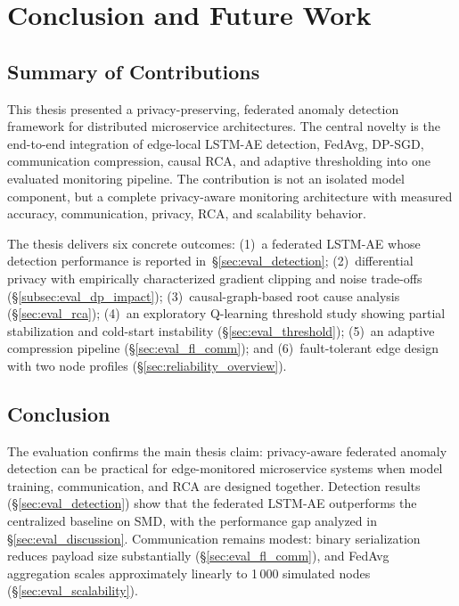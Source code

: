 \chapter{Conclusion and Future Work}
\label{ch:conclusion}

\section{Summary of Contributions}
\label{sec:conclusion_summary}

This thesis presented a privacy-preserving, federated anomaly detection
framework for distributed microservice architectures. The central novelty is
the end-to-end integration of edge-local LSTM-AE detection, FedAvg, DP-SGD,
communication compression, causal RCA, and adaptive thresholding into one
evaluated monitoring pipeline. The contribution is not an isolated model
component, but a complete privacy-aware monitoring architecture with measured
accuracy, communication, privacy, RCA, and scalability behavior.

The thesis delivers six concrete outcomes: (1)~a federated LSTM-AE whose
detection performance is reported in~\S\ref{sec:eval_detection};
(2)~differential privacy with empirically characterized gradient clipping and
noise trade-offs (\S\ref{subsec:eval_dp_impact}); (3)~causal-graph-based root
cause analysis (\S\ref{sec:eval_rca}); (4)~an exploratory Q-learning
threshold study showing partial stabilization and cold-start instability
(\S\ref{sec:eval_threshold}); (5)~an adaptive compression pipeline
(\S\ref{sec:eval_fl_comm}); and (6)~fault-tolerant edge design with two node
profiles (\S\ref{sec:reliability_overview}).

\section{Conclusion}
\label{sec:conclusion_conclusion}

The evaluation confirms the main thesis claim: privacy-aware federated anomaly
detection can be practical for edge-monitored microservice systems when model
training, communication, and RCA are designed together. Detection results
(\S\ref{sec:eval_detection}) show that the federated LSTM-AE outperforms the
centralized baseline on SMD, with the performance gap analyzed in
\S\ref{sec:eval_discussion}. Communication remains modest: binary serialization
reduces payload size substantially (\S\ref{sec:eval_fl_comm}), and FedAvg
aggregation scales approximately linearly to 1\,000 simulated nodes
(\S\ref{sec:eval_scalability}).

